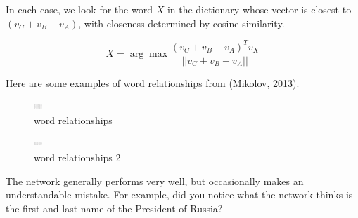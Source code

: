 \documentclass[11pt]{article}
\begin{document}
In each case, we look for the word $X$ in the dictionary whose vector is closest to $(v_C + v_B - v_A)$, with closeness determined by cosine similarity.

\[X = \arg \max \dfrac{(v_C + v_B -v_A)^T v_X}{||v_C + v_B -v_A||}\]

Here are some examples of word relationships from (Mikolov, 2013).

\begin{figure}[h]
    \centering
    \includegraphics[width=12,height=12]{../out/images/word-relationships}
    \caption[word relationships]{word relationships}
    \label{fig:word relationships}
\end{figure}

\begin{figure}[h]
    \centering
    \includegraphics[width=12,height=12]{../out/images/word-relationships-2}
    \caption[word relationships 2]{word relationships 2}
    \label{fig:word relationships 2}
\end{figure}

The network generally performs very well, but occasionally makes an understandable mistake.
For example, did you notice what the network thinks is the first and last name of the President of Russia?
\end{document}
